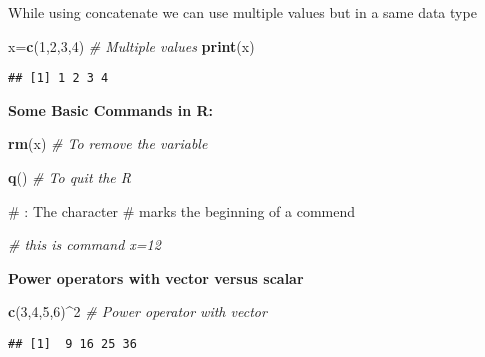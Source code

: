 \documentclass[
]{article}
\newenvironment{Shaded}{\begin{snugshade}}{\end{snugshade}}
\newcommand{\CommentTok}[1]{\textcolor[rgb]{0.56,0.35,0.01}{\textit{#1}}}
\newcommand{\DecValTok}[1]{\textcolor[rgb]{0.00,0.00,0.81}{#1}}
\newcommand{\FunctionTok}[1]{\textcolor[rgb]{0.13,0.29,0.53}{\textbf{#1}}}
\newcommand{\NormalTok}[1]{#1}
\newcommand{\OtherTok}[1]{\textcolor[rgb]{0.56,0.35,0.01}{#1}}
\newcommand{\SpecialCharTok}[1]{\textcolor[rgb]{0.81,0.36,0.00}{\textbf{#1}}}
\begin{document}
While using concatenate we can use multiple values but in a same data
type

\begin{Shaded}
\begin{Highlighting}[]
\NormalTok{ x}\OtherTok{=}\FunctionTok{c}\NormalTok{(}\DecValTok{1}\NormalTok{,}\DecValTok{2}\NormalTok{,}\DecValTok{3}\NormalTok{,}\DecValTok{4}\NormalTok{) }\CommentTok{\# Multiple values}
\FunctionTok{print}\NormalTok{(x)}
\end{Highlighting}
\end{Shaded}

\begin{verbatim}
## [1] 1 2 3 4
\end{verbatim}

\textbf{Some Basic Commands in R:}

\begin{Shaded}
\begin{Highlighting}[]
 \FunctionTok{rm}\NormalTok{(x) }\CommentTok{\# To remove the variable}
\end{Highlighting}
\end{Shaded}

\begin{Shaded}
\begin{Highlighting}[]
\FunctionTok{q}\NormalTok{() }\CommentTok{\# To quit the R}
\end{Highlighting}
\end{Shaded}

\newpage

\# : The character \# marks the beginning of a commend

\begin{Shaded}
\begin{Highlighting}[]
\CommentTok{\# this is command x=12}
\end{Highlighting}
\end{Shaded}

\textbf{Power operators with vector versus scalar}

\begin{Shaded}
\begin{Highlighting}[]
\FunctionTok{c}\NormalTok{(}\DecValTok{3}\NormalTok{,}\DecValTok{4}\NormalTok{,}\DecValTok{5}\NormalTok{,}\DecValTok{6}\NormalTok{)}\SpecialCharTok{\^{}}\DecValTok{2} \CommentTok{\# Power operator with vector}
\end{Highlighting}
\end{Shaded}

\begin{verbatim}
## [1]  9 16 25 36
\end{verbatim}
\end{document}
